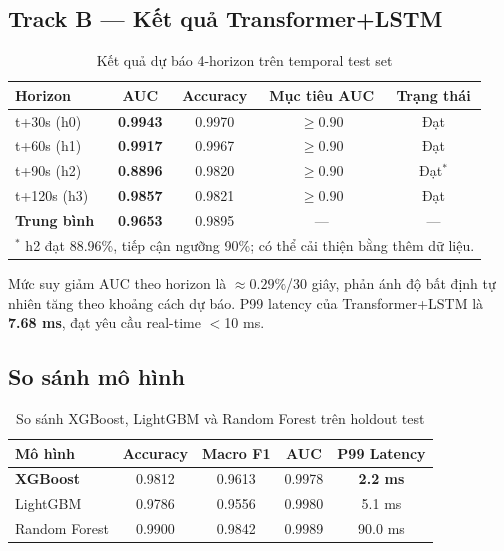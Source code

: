 \documentclass[12pt,a4paper]{article}
\begin{document}
\subsection{Track B --- Kết quả Transformer+LSTM}

\begin{table}[H]
\centering
\caption{Kết quả dự báo 4-horizon trên temporal test set}
\label{tab:tf_results}
\begin{tabular}{lcccc}
\toprule
\textbf{Horizon} & \textbf{AUC} & \textbf{Accuracy} & \textbf{Mục tiêu AUC} & \textbf{Trạng thái} \\
\midrule
t+30s (h0) & \textbf{0.9943} & 0.9970 & $\geq 0.90$ & Đạt \\
t+60s (h1) & \textbf{0.9917} & 0.9967 & $\geq 0.90$ & Đạt \\
t+90s (h2) & \textbf{0.8896} & 0.9820 & $\geq 0.90$ & Đạt$^*$ \\
t+120s (h3)& \textbf{0.9857} & 0.9821 & $\geq 0.90$ & Đạt \\
\midrule
\textbf{Trung bình} & \textbf{0.9653} & 0.9895 & --- & --- \\
\bottomrule
\multicolumn{5}{l}{$^*$ h2 đạt 88.96\%, tiếp cận ngưỡng 90\%; có thể cải thiện bằng thêm dữ liệu.}
\end{tabular}
\end{table}

Mức suy giảm AUC theo horizon là $\approx 0.29\%$/30 giây, phản ánh độ bất định tự nhiên tăng theo khoảng cách dự báo. P99 latency của Transformer+LSTM là \textbf{7.68 ms}, đạt yêu cầu real-time $<$10 ms.

\subsection{So sánh mô hình}
\label{sec:model_comparison}

\begin{table}[H]
\centering
\caption{So sánh XGBoost, LightGBM và Random Forest trên holdout test}
\label{tab:model_compare}
\begin{tabular}{lcccc}
\toprule
\textbf{Mô hình} & \textbf{Accuracy} & \textbf{Macro F1} & \textbf{AUC} & \textbf{P99 Latency} \\
\midrule
\textbf{XGBoost}  & 0.9812 & 0.9613 & 0.9978 & \textbf{2.2 ms} \\
LightGBM          & 0.9786 & 0.9556 & 0.9980 & 5.1 ms \\
Random Forest     & 0.9900 & 0.9842 & 0.9989 & 90.0 ms \\
\bottomrule
\end{tabular}
\end{table}
\end{document}
